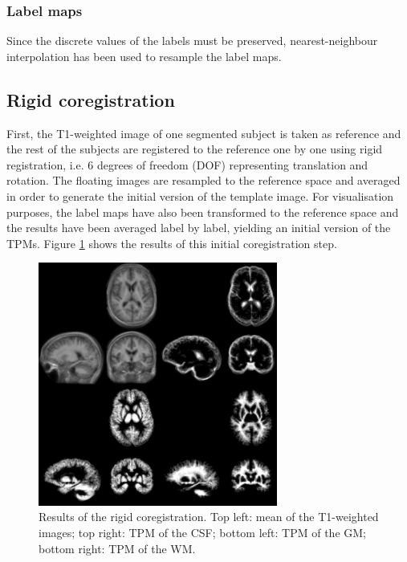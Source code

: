 \subsubsection{Label maps} Since the discrete values of the labels must be preserved, nearest-neighbour interpolation has been used to resample the label maps.



\subsection{Rigid coregistration}
First, the T1-weighted image of one segmented subject is taken as reference and the rest of the subjects are registered to the reference one by one using rigid registration, i.e. 6 degrees of freedom (DOF) representing translation and rotation. The floating images are resampled to the reference space and averaged in order to generate the initial version of the template image. For visualisation purposes, the label maps have also been transformed to the reference space and the results have been averaged label by label, yielding an initial version of the TPMs. Figure \ref{fig:template-rigid} shows the results of this initial coregistration step.

\begin{figure}
  \centering
  \includegraphics[width=0.7\textwidth]{figures/rigid_template_collage}
  \caption{Results of the rigid coregistration. Top left: mean of the T1-weighted images; top right: TPM of the CSF; bottom left: TPM of the GM; bottom right: TPM of the WM.}
  \label{fig:template-rigid}
\end{figure}

